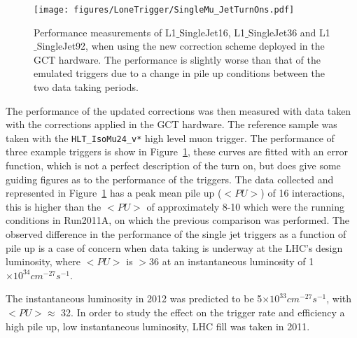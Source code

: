 \begin{figure}[htbp]
  \centering
    \texttt{[image: figures/LoneTrigger/SingleMu\_JetTurnOns.pdf]}
  \caption{Performance measurements of L1$\_$SingleJet16, L1$\_$SingleJet36 and L1$\_$SingleJet92, when using the new correction scheme deployed in the GCT hardware. The performance is slightly worse than that of the emulated triggers due to a change in pile up conditions between the two data taking periods.}
  \label{fig:figures_LoneTrigger_SingleMu_JetTurnOns}
\end{figure}

The performance of the updated corrections was then measured with data taken with the corrections applied in the GCT hardware. The reference sample was taken with the  \verb|HLT_IsoMu24_v*| high level muon trigger.
The performance of three example triggers is show in Figure~\ref{fig:figures_LoneTrigger_SingleMu_JetTurnOns}, these curves are fitted with an error function, which is not a perfect description of the turn on, but does give some guiding figures as to the performance of the triggers. The data collected and represented in Figure~\ref{fig:figures_LoneTrigger_SingleMu_JetTurnOns} has a peak mean pile up ($<PU>$) of 16 interactions, this is higher than the $<PU>$ of approximately 8-10 which were the running conditions in Run2011A, on which the previous comparison was performed.
The observed difference in the performance of the \Lone single jet triggers as a function of pile up is a case of concern when data taking is underway at the LHC's design luminosity, where $<PU>$ is $>$36 at an instantaneous luminosity of 1$\times 10 ^{34} cm^{-27}s^{-1}$.

The instantaneous luminosity in 2012 was predicted to be 5$\times 10 ^{33} cm^{-27}s^{-1}$, with $<PU> \approx$ 32. In order to study the effect on the trigger rate and efficiency a high pile up, low instantaneous luminosity, LHC fill was taken in 2011.

